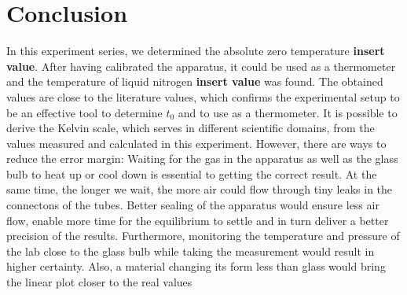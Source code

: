 \section{Conclusion}
    In this experiment series, we determined the absolute zero temperature \textbf{insert value}.
    After having calibrated the apparatus, it could be used as a thermometer and the temperature of liquid nitrogen \textbf{insert value} was found.
    The obtained values are close to the literature values, which confirms the experimental setup to be an effective tool to determine $t_0$ and to use as a thermometer.
    It is possible to derive the Kelvin scale, which serves in different scientific domains, from the values measured and calculated in this experiment.
    However, there are ways to reduce the error margin:
    Waiting for the gas in the apparatus as well as the glass bulb to heat up or cool down is essential to getting the correct result.
    At the same time, the longer we wait, the more air could flow through tiny leaks in the connectons of the tubes.
    Better sealing of the apparatus would ensure less air flow, enable more time for the equilibrium to settle and in turn deliver a better precision of the results.
    Furthermore, monitoring the temperature and pressure of the lab close to the glass bulb while taking the measurement would result in higher certainty.
    Also, a material changing its form less than glass would bring the linear plot closer to the real values

